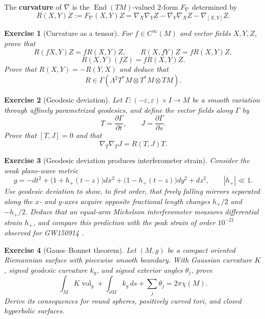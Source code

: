 \documentclass{article}
\newtheorem{exercise}{Exercise}
\newcommand{\End}{\operatorname{End}}
\begin{document}
The \textbf{curvature} of $\nabla$ is the $\End(TM)$-valued $2$-form $F_\nabla$ determined by
\[
R(X,Y)Z
:=F_\nabla(X,Y)Z
=\nabla_X\nabla_YZ-\nabla_Y\nabla_XZ-\nabla_{[X,Y]}Z.
\]

\begin{exercise}[Curvature as a tensor]\leavevmode\par
\textit{For $f\in C^\infty(M)$ and vector fields $X,Y,Z$, prove that}
\[
R(fX,Y)Z=fR(X,Y)Z,
\qquad
R(X,fY)Z=fR(X,Y)Z,
\]
\[
R(X,Y)(fZ)=fR(X,Y)Z.
\]
\textit{Prove that $R(X,Y)=-R(Y,X)$ and deduce that}
\[
R\in\Gamma\!\left(\Lambda^2T^*M\otimes T^*M\otimes TM\right).
\]
\end{exercise}

\begin{exercise}[Geodesic deviation]
\textit{Let $\Gamma:(-\varepsilon,\varepsilon)\times I\to M$ be a smooth
variation through affinely parametrized geodesics, and define the vector
fields along $\Gamma$ by}
\[
T=\frac{\partial\Gamma}{\partial t},
\qquad
J=\frac{\partial\Gamma}{\partial s}.
\]
\textit{Prove that $[T,J]=0$ and that}
\[
\nabla_T\nabla_TJ=R(T,J)T.
\]
\end{exercise}

\begin{exercise}[Geodesic deviation produces interferometer strain]
\leavevmode\par
\textit{Consider the weak plane-wave metric}
\[
g=-dt^2+\bigl(1+h_+(t-z)\bigr)dx^2
+\bigl(1-h_+(t-z)\bigr)dy^2+dz^2,
\qquad |h_+|\ll1.
\]
\textit{Use geodesic deviation to show, to first order, that freely falling
mirrors separated along the $x$- and $y$-axes acquire opposite fractional
length changes $h_+/2$ and $-h_+/2$. Deduce that an equal-arm Michelson
interferometer measures differential strain $h_+$, and compare this prediction
with the peak strain of order $10^{-21}$ observed for GW150914
\cite{ligo-gw150914}.}
\end{exercise}

\begin{exercise}[Gauss--Bonnet theorem]\leavevmode\par
\textit{Let $(M,g)$ be a compact oriented Riemannian surface with piecewise
smooth boundary. With Gaussian curvature $K$, signed geodesic curvature
$k_g$, and signed exterior angles $\theta_j$, prove} \cite{do-carmo}
\[
\int_MK\operatorname{vol}_g
+\int_{\partial M}k_g\,ds
+\sum_j\theta_j
=2\pi\chi(M).
\]
\textit{Derive its consequences for round spheres, positively curved tori,
and closed hyperbolic surfaces.}
\end{exercise}
\end{document}
